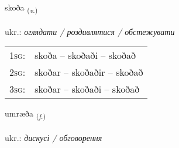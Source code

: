 \documentclass[frontgrid, backgrid]{flacards}\usepackage[]{graphicx}\usepackage[]{xcolor}
\begin{document}
\renewcommand{\blhead}{\vskip5pt {\small\bfseries\footnotesize Sagnorð | дієслово }}
\renewcommand{\bcfoot}{\vskip5pt \hspace{2pt}{\small\bfseries\footnotesize 1K}}


{skoða \small{\textsubscript{(\textit{v.})}} \\[1ex] %
\textphonetic{[skɔːða]} \\
ukr.: \emph{оглядати / роздивлятися / обстежувати} \\  [2ex]
\renewcommand*{\arraystretch}{0.8}
\begin{tabular}{p{1cm}l}
\textsc{1sg}: & skoða -- skoðaði -- skoðað \\ 
\textsc{2sg}: & skoðar -- skoðaðir -- skoðað \\ 
\textsc{3sg}: & skoðar -- skoðaði -- skoðað \\ 
\end{tabular}
}

\renewcommand{\flhead}{\vskip5pt \fboxsep=0pt {\small\bfseries\footnotesize Nafnorð | іменник}}
\renewcommand{\fcfoot}{\vskip5pt \fboxsep=0pt \hspace{2pt}{\small\bfseries\footnotesize 1K}}

\renewcommand{\blhead}{\vskip5pt {\small\bfseries\footnotesize Nafnorð | іменник }}
\renewcommand{\bcfoot}{\vskip5pt \hspace{2pt}{\small\bfseries\footnotesize 1K}}


{umræða \small{\textsubscript{(\textit{f.})}} \\[1ex] %
\textphonetic{[ʏmraiða]} \\
ukr.: \emph{дискусі / обговорення} \\  [2ex]
\renewcommand*{\arraystretch}{0.8}
}
\end{document}
